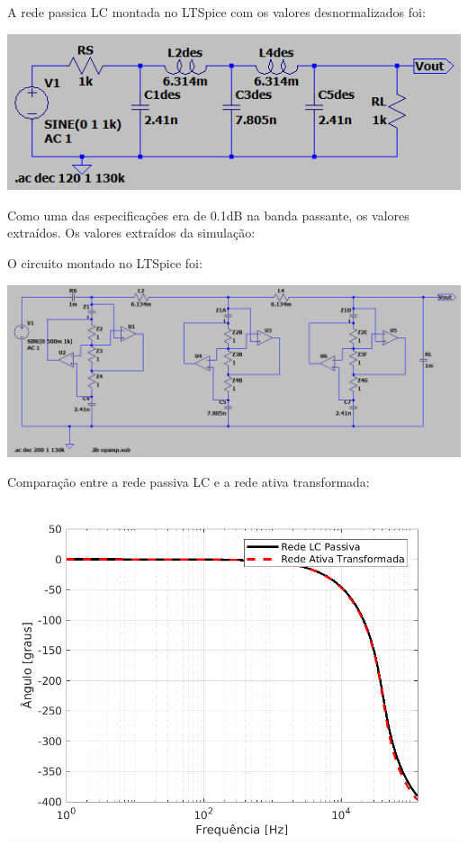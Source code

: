 \documentclass{article}
\begin{document}
A rede passica LC montada no LTSpice com os valores desnormalizados foi:
\begin{center}
\centering
  \includegraphics[scale=0.8]{img/ladder.png}
\end{center}

Como uma das especificações era de 0.1dB na banda passante, os valores extraídos. Os valores extraídos da simulação:


O circuito montado no LTSpice foi:
\begin{center}
\centering
  \includegraphics[scale=0.5]{img/passivoativo.png}
\end{center}


Comparação entre a rede passiva LC e a rede ativa transformada:
\begin{center}
\centering
  \includegraphics[scale=0.5]{img/phase.png}
\end{center}
\end{document}
